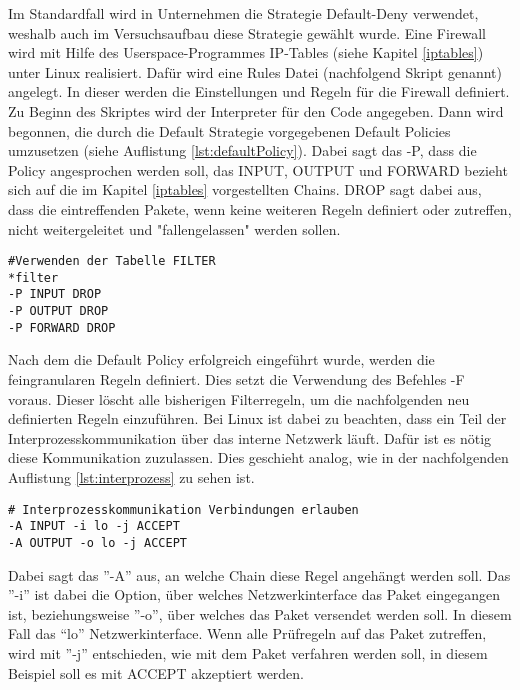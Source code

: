 Im Standardfall wird in Unternehmen die Strategie Default-Deny verwendet, weshalb auch im Versuchsaufbau diese Strategie gewählt wurde. Eine Firewall wird mit Hilfe des Userspace-Programmes IP-Tables (siehe Kapitel \ref{iptables}) unter Linux realisiert. Dafür wird eine Rules Datei (nachfolgend Skript genannt) angelegt. In dieser werden die Einstellungen und Regeln für die Firewall definiert. Zu Beginn des Skriptes wird der Interpreter für den Code angegeben. Dann wird begonnen, die durch die Default Strategie vorgegebenen Default Policies umzusetzen (siehe Auflistung \ref{lst:defaultPolicy}). Dabei sagt das -P, dass die Policy angesprochen werden soll, das INPUT, OUTPUT und FORWARD bezieht sich auf die im Kapitel \ref{iptables} vorgestellten Chains. DROP sagt dabei aus, dass die eintreffenden Pakete, wenn keine weiteren Regeln definiert oder zutreffen, nicht weitergeleitet und "fallengelassen" werden sollen.
\newline
\lstset{
	basicstyle=\footnotesize, frame=tb,
	xleftmargin=.2\textwidth, xrightmargin=.2\textwidth
}
\begin{lstlisting}[caption={Default Policy IPTABLE},label=lst:defaultPolicy]
#Verwenden der Tabelle FILTER
*filter
-P INPUT DROP
-P OUTPUT DROP
-P FORWARD DROP
\end{lstlisting}
\vspace{\baselineskip}
Nach dem die Default Policy erfolgreich eingeführt wurde, werden die feingranularen Regeln definiert. Dies setzt die Verwendung des Befehles -F voraus. Dieser löscht alle bisherigen Filterregeln, um die nachfolgenden neu definierten Regeln einzuführen. Bei Linux ist dabei zu beachten, dass ein Teil der Interprozesskommunikation über das interne Netzwerk läuft. Dafür ist es nötig diese Kommunikation zuzulassen. 
Dies geschieht analog, wie in der nachfolgenden Auflistung \ref{lst:interprozess} zu sehen ist. 
\newline
\lstset{
	basicstyle=\footnotesize, frame=tb,
	xleftmargin=.2\textwidth, xrightmargin=.2\textwidth
}
\begin{lstlisting}[caption={Interprozesskommunikation zulassen},label=lst:interprozess]
# Interprozesskommunikation Verbindungen erlauben
-A INPUT -i lo -j ACCEPT
-A OUTPUT -o lo -j ACCEPT
\end{lstlisting}
\vspace{\baselineskip}
Dabei sagt das ''-A'' aus, an welche Chain diese Regel angehängt werden soll. Das ''-i'' ist dabei die Option, über welches Netzwerkinterface das Paket eingegangen ist, beziehungsweise ''-o'', über welches das Paket versendet werden soll. In diesem Fall das ``lo'' Netzwerkinterface. Wenn alle Prüfregeln auf das Paket zutreffen, wird mit ''-j'' entschieden, wie mit dem Paket verfahren werden soll, in diesem Beispiel soll es mit ACCEPT akzeptiert werden. 
